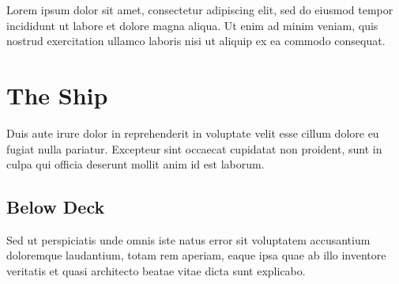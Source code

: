 \documentclass[11pt,oneside]{memoir}
\begin{document}
Lorem ipsum dolor sit amet, consectetur adipiscing elit, sed do eiusmod tempor incididunt ut labore et dolore magna aliqua. Ut enim ad minim veniam, quis nostrud exercitation ullamco laboris nisi ut aliquip ex ea commodo consequat.
\section{The Ship}
Duis aute irure dolor in reprehenderit in voluptate velit esse cillum dolore eu fugiat nulla pariatur. Excepteur sint occaecat cupidatat non proident, sunt in culpa qui officia deserunt mollit anim id est laborum.
\subsection{Below Deck}
Sed ut perspiciatis unde omnis iste natus error sit voluptatem accusantium doloremque laudantium, totam rem aperiam, eaque ipsa quae ab illo inventore veritatis et quasi architecto beatae vitae dicta sunt explicabo.
\end{document}
